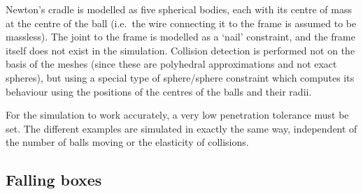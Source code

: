 Newton's cradle is modelled as five spherical bodies, each with its centre of mass at the centre
of the ball (i.e.\ the wire connecting it to the frame is assumed to be massless). The joint to
the frame is modelled as a `nail' constraint, and the frame itself does not exist in the
simulation. Collision detection is performed not on the basis of the meshes (since these are
polyhedral approximations and not exact spheres), but using a special type of sphere/sphere
constraint which computes its behaviour using the positions of the centres of the balls and their
radii.

For the simulation to work accurately, a very low penetration tolerance must be set. The different
examples are simulated in exactly the same way, independent of the number of balls moving or the
elasticity of collisions.

\subsection{Falling boxes}

